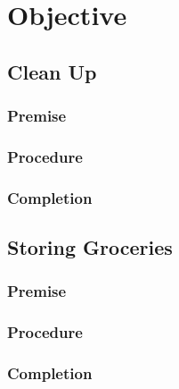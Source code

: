 \documentclass[main.tex]{subfiles}
\begin{document}
	
	\chapter{Objective}
	\section{Clean Up}
	
	\subsection{Premise}
		\begin{itemize}
			
			
		\end{itemize} 
		
	\subsection{Procedure}
		\begin{itemize}			
						
		\end{itemize}
	
	\subsection{Completion}
	\begin{itemize}
	
	\end{itemize}
	
	\section{Storing Groceries}
	
	\subsection{Premise}
		\begin{itemize}
			
			
		\end{itemize} 
		
	\subsection{Procedure}
		\begin{itemize}			
						
		\end{itemize}
	
	\subsection{Completion}
	\begin{itemize}
	
	\end{itemize}
\end{document}
